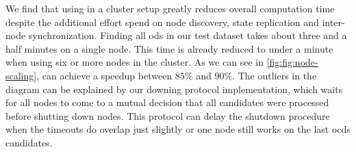   We find that using \dodo{} in a cluster setup greatly reduces overall computation time despite the additional effort spend on node discovery, state replication and inter-node synchronization.
  Finding all \glspl{od} in our test dataset takes about three and a half minutes on a single node.
  This time is already reduced to under a minute when using six or more nodes in the \dodo{} cluster.
  As we can see in \cref{fig:fig:node-scaling}, \dodo{} can achieve a speedup between $85 \%$ and $90 \%$.
  The outliers in the diagram can be explained by our downing protocol implementation, which waits for all nodes to come to a mutual decision that all candidates were processed before shutting down nodes.
  This protocol can delay the shutdown procedure when the timeouts do overlap just slightly or one node still works on the last \glspl{ocd} candidates.
